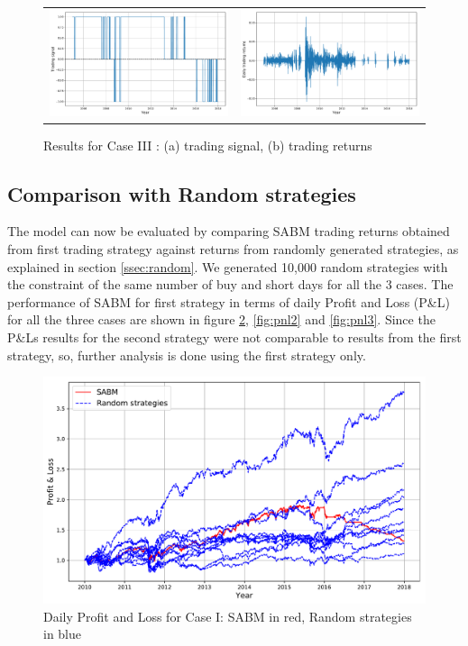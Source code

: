 \begin{figure}[h!] 
\begin{tabular}{cc}
\centering 
 \includegraphics[width=0.5\linewidth]{figures/tradingSig_llf5.pdf} & \includegraphics[width=0.5\linewidth]{figures/tradingRet_llf5.pdf} \\
\end{tabular}
\caption{Results for Case III : (a) trading signal, (b) trading returns}
\label{fig:t3}
\end{figure}

\subsection{Comparison with Random strategies}

The model can now be evaluated by comparing SABM trading returns obtained from first trading strategy against returns from randomly generated strategies, as explained in section \ref{ssec:random}. We generated 10,000 random strategies with the constraint of the same number of buy and short days for all the 3 cases. 
The performance of SABM for first strategy in terms of daily Profit and Loss (P\&L) for all the three cases are shown in figure \ref{fig:pnl1}, \ref{fig:pnl2} and \ref{fig:pnl3}. Since the P\&Ls results for the second strategy were not comparable to results from the first strategy, so, further analysis is done using the first strategy only.

\begin{figure}[h!]
\centering 
 \includegraphics[width=0.75\linewidth]{figures/pnls_yearly.pdf} 
\caption{Daily Profit and Loss for Case I: SABM in red, Random strategies in blue}
\label{fig:pnl1}
\end{figure}

